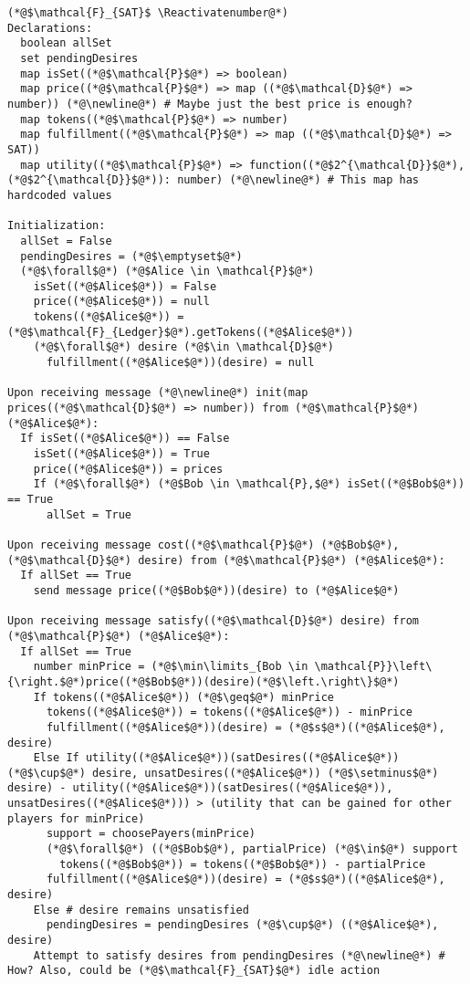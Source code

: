 \Suppressnumber
\begin{lstlisting}[label=satfunc, style=numbers]
(*@$\mathcal{F}_{SAT}$ \Reactivatenumber@*)
Declarations:
  boolean allSet
  set pendingDesires
  map isSet((*@$\mathcal{P}$@*) => boolean)
  map price((*@$\mathcal{P}$@*) => map ((*@$\mathcal{D}$@*) => number)) (*@\newline@*) # Maybe just the best price is enough?
  map tokens((*@$\mathcal{P}$@*) => number)
  map fulfillment((*@$\mathcal{P}$@*) => map ((*@$\mathcal{D}$@*) => SAT))
  map utility((*@$\mathcal{P}$@*) => function((*@$2^{\mathcal{D}}$@*), (*@$2^{\mathcal{D}}$@*)): number) (*@\newline@*) # This map has hardcoded values

Initialization:
  allSet = False
  pendingDesires = (*@$\emptyset$@*)
  (*@$\forall$@*) (*@$Alice \in \mathcal{P}$@*)
    isSet((*@$Alice$@*)) = False
    price((*@$Alice$@*)) = null
    tokens((*@$Alice$@*)) = (*@$\mathcal{F}_{Ledger}$@*).getTokens((*@$Alice$@*))
    (*@$\forall$@*) desire (*@$\in \mathcal{D}$@*)
      fulfillment((*@$Alice$@*))(desire) = null

Upon receiving message (*@\newline@*) init(map prices((*@$\mathcal{D}$@*) => number)) from (*@$\mathcal{P}$@*) (*@$Alice$@*):
  If isSet((*@$Alice$@*)) == False
    isSet((*@$Alice$@*)) = True
    price((*@$Alice$@*)) = prices
    If (*@$\forall$@*) (*@$Bob \in \mathcal{P},$@*) isSet((*@$Bob$@*)) == True
      allSet = True

Upon receiving message cost((*@$\mathcal{P}$@*) (*@$Bob$@*), (*@$\mathcal{D}$@*) desire) from (*@$\mathcal{P}$@*) (*@$Alice$@*):
  If allSet == True
    send message price((*@$Bob$@*))(desire) to (*@$Alice$@*)

Upon receiving message satisfy((*@$\mathcal{D}$@*) desire) from (*@$\mathcal{P}$@*) (*@$Alice$@*):
  If allSet == True
    number minPrice = (*@$\min\limits_{Bob \in \mathcal{P}}\left\{\right.$@*)price((*@$Bob$@*))(desire)(*@$\left.\right\}$@*)
    If tokens((*@$Alice$@*)) (*@$\geq$@*) minPrice
      tokens((*@$Alice$@*)) = tokens((*@$Alice$@*)) - minPrice
      fulfillment((*@$Alice$@*))(desire) = (*@$s$@*)((*@$Alice$@*), desire)
    Else If utility((*@$Alice$@*))(satDesires((*@$Alice$@*)) (*@$\cup$@*) desire, unsatDesires((*@$Alice$@*)) (*@$\setminus$@*) desire) - utility((*@$Alice$@*))(satDesires((*@$Alice$@*)), unsatDesires((*@$Alice$@*))) > (utility that can be gained for other players for minPrice)
      support = choosePayers(minPrice)
      (*@$\forall$@*) ((*@$Bob$@*), partialPrice) (*@$\in$@*) support
        tokens((*@$Bob$@*)) = tokens((*@$Bob$@*)) - partialPrice
      fulfillment((*@$Alice$@*))(desire) = (*@$s$@*)((*@$Alice$@*), desire)
    Else # desire remains unsatisfied
      pendingDesires = pendingDesires (*@$\cup$@*) ((*@$Alice$@*), desire)
    Attempt to satisfy desires from pendingDesires (*@\newline@*) # How? Also, could be (*@$\mathcal{F}_{SAT}$@*) idle action


\end{lstlisting}
